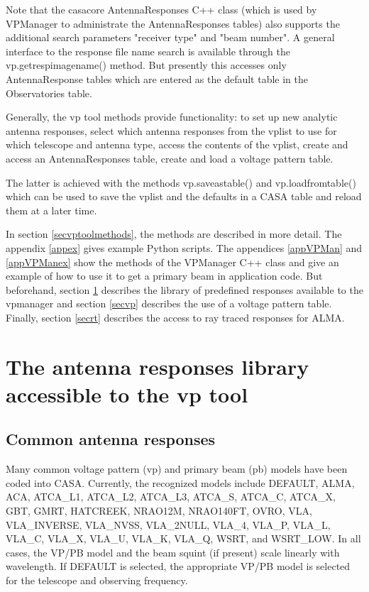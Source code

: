 \documentclass[12pt]{article}
\begin{document}
Note that the casacore AntennaResponses C++ class (which is used by VPManager to
administrate the AntennaResponses tables) also supports the additional search parameters
"receiver type" and "beam number". A general interface to the response file name search
is available through the vp.getrespimagename() method. But presently this accesses only
AntennaResponse tables which are entered as the default table in the Observatories table.

Generally, the vp tool methods provide functionality:
to set up new analytic antenna responses,
select which antenna responses from the vplist to use for which telescope and antenna type, 
access the contents of the vplist,
create and access an AntennaResponses table,
create and load a voltage pattern table.

The latter is achieved with the methods vp.saveastable() and vp.loadfromtable() which
can be used to save the vplist and the defaults in a CASA table and reload
them at a later time.

In section \ref{secvptoolmethods}, the methods are described in more detail.
The appendix \ref{appex} gives example Python scripts.
The appendices \ref{appVPMan} and \ref{appVPManex} show the methods of the VPManager C++ class
and give an example of how to use it to get a primary beam in application code.
But beforehand, section \ref{seclib} describes the library of predefined responses 
available to the vpmanager and section \ref{secvp} describes the use of a voltage pattern table.
Finally, section \ref{secrt} describes the access to ray traced responses for ALMA.

\section{The antenna responses library accessible to the vp tool}
\label{seclib}

\subsection{Common antenna responses}

Many common voltage pattern (vp) and primary beam (pb)
models have been coded into CASA.  Currently, the recognized models include
DEFAULT, ALMA, ACA, ATCA\_L1, ATCA\_L2, ATCA\_L3, ATCA\_S, ATCA\_C, ATCA\_X, GBT, GMRT,
HATCREEK, NRAO12M, NRAO140FT, OVRO, VLA, VLA\_INVERSE, VLA\_NVSS,
VLA\_2NULL, VLA\_4, VLA\_P, VLA\_L, VLA\_C, VLA\_X, VLA\_U, VLA\_K, VLA\_Q,
WSRT, and WSRT\_LOW.  In all cases, the VP/PB model and the beam squint (if
present) scale linearly with wavelength.  If DEFAULT is selected, the
appropriate VP/PB model is selected for the telescope and observing frequency.
\end{document}
